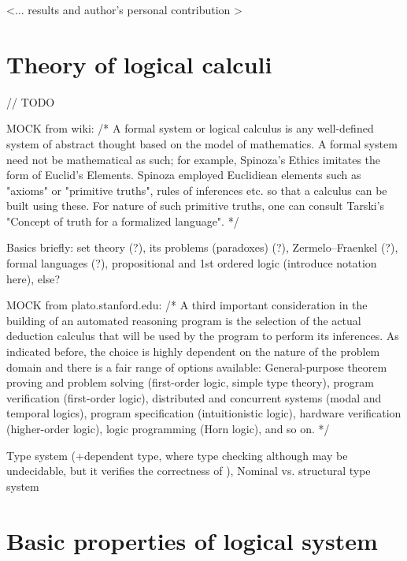 \documentclass[article]{aaltoseries}
\begin{document}
<... results and author's personal contribution >


\section{Theory of logical calculi}
\label{sec:formal_theory}

// TODO

MOCK from wiki: /* A formal system or logical calculus is any well-defined system of abstract thought based on the model of mathematics. A formal system need not be mathematical as such; for example, Spinoza's Ethics imitates the form of Euclid's Elements. Spinoza employed Euclidiean elements such as "axioms" or "primitive truths", rules of inferences etc. so that a calculus can be built using these. For nature of such primitive truths, one can consult Tarski's "Concept of truth for a formalized language".
*/

Basics briefly: set theory (?), its problems (paradoxes) (?), Zermelo–Fraenkel (?), formal languages (?), propositional and 1st ordered logic (introduce notation here), else?


MOCK from plato.stanford.edu:  %
/* A third important consideration in the building of an automated reasoning program is the selection of the actual deduction calculus that will be used by the program to perform its inferences. As indicated before, the choice is highly dependent on the nature of the problem domain and there is a fair range of options available: General-purpose theorem proving and problem solving (first-order logic, simple type theory), program verification (first-order logic), distributed and concurrent systems (modal and temporal logics), program specification (intuitionistic logic), hardware verification (higher-order logic), logic programming (Horn logic), and so on.
*/

Type system (+dependent type, where type checking although may be undecidable, but it verifies the correctness of ), Nominal vs. structural type system


\section{Basic properties of logical system}
\label{sec:logic_properties}
\end{document}
